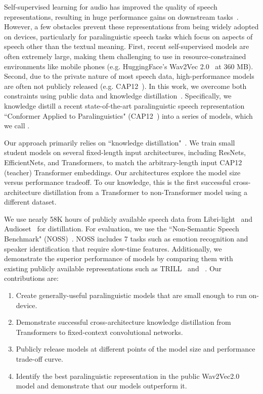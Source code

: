 Self-supervised learning for audio has improved the quality of speech representations, resulting in huge performance gains on downstream tasks~\cite{bigssl, hubert, baevski2020wav2vec}. 
However, a few obstacles prevent these representations from being widely adopted on devices, particularly for paralinguistic speech tasks which focus on aspects of speech other than the textual meaning.
First, recent self-supervised models are often extremely large, making them challenging to use in resource-constrained environments like mobile phones (e.g. HuggingFace's Wav2Vec 2.0~\cite{baevski2020wav2vec} at 360 MB).
Second, due to the private nature of most speech data, high-performance models are often not publicly released (e.g. CAP12~\cite{cap12}). In this work, we overcome both constraints using public data and knowledge distillation~\cite{distillation}. Specifically, we knowledge distill a recent state-of-the-art paralinguistic speech representation ``Conformer Applied to Paralinguistics" (CAP12~\cite{cap12}) into a series of models, which we call \trillsson.

Our approach primarily relies on ``knowledge distillation"~\cite{distillation}. We train small student models on several fixed-length input architectures, including ResNets, EfficientNets, and Transformers, to match the arbitrary-length input CAP12 (teacher) Transformer embeddings. Our architectures explore the model size versus performance tradeoff. To our knowledge, this is the first successful cross-architecture distillation from a Transformer to non-Transformer model using a different dataset. 

We use nearly 58K hours of publicly available speech data from Libri-light~\cite{librilight} and Audioset~\cite{hershey2017cnn} for distillation. %
For evaluation, we use the ``Non-Semantic Speech Benchmark" (NOSS)~\cite{trill}. NOSS includes 7 tasks such as emotion recognition and speaker identification that require slow-time features.
Additionally, we demonstrate the superior performance of \trillsson{} models by comparing them with existing publicly available representations such as TRILL~\cite{trill} and \wavvec~\cite{baevski2020wav2vec}.
Our contributions are:
\begin{enumerate}\itemsep0em
   \item Create generally-useful paralinguistic models that are small enough to run on-device.
   \item Demonstrate successful cross-architecture knowledge distillation from Transformers to fixed-context convolutional networks.
    \item Publicly release models at different points of the model size and performance trade-off curve.
    \item Identify the best paralinguistic representation in the public Wav2Vec2.0 model and demonstrate that our models outperform it.
 \end{enumerate}

